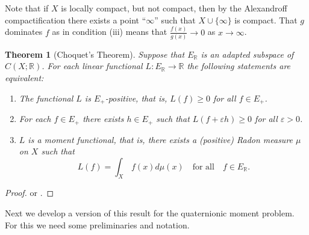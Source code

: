 \documentclass[11pt,a4paper]{amsart}
\newtheorem{theorem}{Theorem}[section]
\theoremstyle{definition}
\begin{document}
Note that if $X$ is locally compact, but not compact, then by the Alexandroff
compactification there exists a point ``$\infty $'' such that
$X\cup \{\infty \}$ is compact. That $g$ dominates $f$ as in condition
(iii) means that $\frac{f(x)}{g(x)}\to 0$ as $x\to \infty $.
%
\begin{theorem}[Choquet's Theorem]%
\label{choquet}%
 Suppose that $E_{\mathbb{R}}$ is an adapted subspace
of $C(X;\mathbb{R})$. For each linear functional
$L:E_{\mathbb{R}}\to \mathbb{R}$ the following statements are equivalent:
%
\begin{enumerate}
%
\item[\emph{(i)}] The functional $L$ is $E_{+}$-positive, that is,
$L(f)\geq 0$ for all $f\in E_{+}$.
%
\item[\emph{(ii)}] For each $f\in E_{+}$ there exists $h\in E_{+}$ such that
$L(f+\varepsilon h)\geq 0$  for all $\varepsilon >0$.
%
\item[\emph{(iii)}] $L$ is a moment functional, that is, there exists a (positive)
Radon measure $\mu $ on $X$ such that
%
\begin{equation*}
L(f) = \int _{X}\, f(x) d\mu (x)\quad \text{for all}\quad f \in E_{
\mathbb{R}}.
\end{equation*}
%
\end{enumerate}
%
\end{theorem}
%
\begin{proof}
\cite{Choquet1969} or \cite[Theorem 1.8]{Schmudgen2017}.
\end{proof}

Next we develop a version of this result for the quaternionic moment problem.
For this we need some preliminaries and notation.
\end{document}
